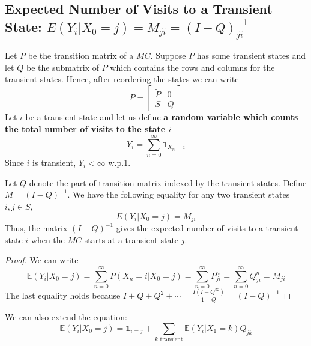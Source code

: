 \documentclass[11pt]{elegantbook}
\begin{document}
\subsection{Expected Number of Visits to a Transient State: $E(Y_i|X_0 = j) = M_{ji} = (I-Q)^{-1}_{ji}$}
Let $P$ be the transition matrix of a $MC$. Suppose $P$ has some transient states and let $Q$ be the submatrix of $P$ which contains the rows and columns for the transient states. Hence, after reordering the states we can write $$P=\begin{bmatrix}
    \tilde{P}&0\\
    S&Q
\end{bmatrix}$$
Let $i$ be a transient state and let us define \textbf{a random variable which counts the total number of visits to the state $i$}$$Y_i=\sum_{n=0}^\infty \mathbf{1}_{X_n=i}$$
Since $i$ is transient, $Y_i<\infty$ w.p.1.
\begin{lemma}
    Let $Q$ denote the part of transition matrix indexed by the transient states. Define $M = (I-Q)^{-1}$. We have the following equality for any two transient states $i,j\in S$,
    $$E(Y_i|X_0 = j) = M_{ji}$$ Thus, the matrix $(I-Q)^{-1}$ gives the expected number of visits to a transient state $i$ when the $MC$ starts at a transient state $j$.
\end{lemma}
\begin{proof}
    We can write $$\mathbb{E}(Y_i|X_0 = j)=\sum_{n=0}^\infty P(X_n=i|X_0=j)=\sum_{n=0}^\infty P^n_{ji}=\sum_{n=0}^\infty Q^n_{ji}=M_{ji}$$
    The last equality holds because $I+Q+Q^2+\cdots=\frac{I(I-Q^\infty)}{1-Q}=(I-Q)^{-1}$
\end{proof}

We can also extend the equation: $$\mathbb{E}(Y_i|X_0 = j)=\mathbf{1}_{i=j}+\sum_{k\text{ transient}}\mathbb{E}(Y_i|X_1=k)Q_{jk}$$
\end{document}
